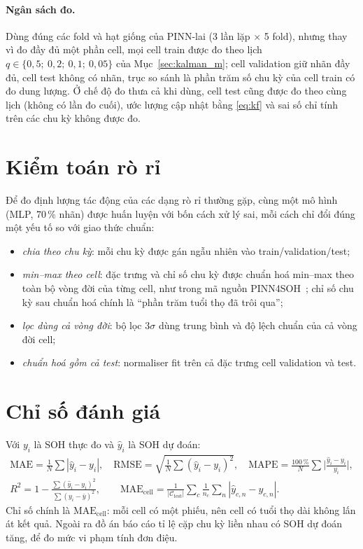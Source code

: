 \documentclass[12pt,a4paper,oneside]{report}
\theoremstyle{plain}
\theoremstyle{definition}
\begin{document}
\paragraph{Ngân sách đo.} Dùng đúng các fold và hạt giống của PINN-lai (3 lần lặp $\times$ 5 fold), nhưng thay vì đo
đầy đủ một phần cell, mọi cell train được đo theo lịch $q \in \{0{,}5;\ 0{,}2;\ 0{,}1;\ 0{,}05\}$ của
Mục~\ref{sec:kalman_m}; cell validation giữ nhãn đầy đủ, cell test không có nhãn, trục so sánh là phần trăm số chu kỳ
của cell train có đo dung lượng. Ở chế độ đo thưa cả khi dùng, cell test cũng được đo theo cùng lịch (không có lần đo
cuối), ước lượng cập nhật bằng \eqref{eq:kf} và sai số chỉ tính trên các chu kỳ không được đo.
\section{Kiểm toán rò rỉ}\label{sec:audit}

Để đo định lượng tác động của các dạng rò rỉ thường gặp, cùng một mô hình (MLP, 70\,\% nhãn) được huấn luyện với
bốn cách xử lý sai, mỗi cách chỉ đổi đúng một yếu tố so với giao thức chuẩn:
\begin{itemize}
\item \emph{chia theo chu kỳ}: mỗi chu kỳ được gán ngẫu nhiên vào train/validation/test;
\item \emph{min--max theo cell}: đặc trưng và chỉ số chu kỳ được chuẩn hoá min--max theo toàn bộ vòng đời của
      từng cell, như trong mã nguồn PINN4SOH~\cite{wang2024}; chỉ số chu kỳ sau chuẩn hoá chính là “phần trăm tuổi
      thọ đã trôi qua”;
\item \emph{lọc dùng cả vòng đời}: bộ lọc $3\sigma$ dùng trung bình và độ lệch chuẩn của cả vòng đời cell;
\item \emph{chuẩn hoá gồm cả test}: normaliser fit trên cả đặc trưng cell validation và test.
\end{itemize}

\section{Chỉ số đánh giá}

Với $y_i$ là SOH thực đo và $\hat y_i$ là SOH dự đoán:
\begin{gather}
\mathrm{MAE} = \tfrac{1}{N}\textstyle\sum|\hat y_i - y_i|, \quad
\mathrm{RMSE} = \sqrt{\tfrac{1}{N}\textstyle\sum(\hat y_i - y_i)^2}, \quad
\mathrm{MAPE} = \tfrac{100\,\%}{N}\textstyle\sum\big|\tfrac{\hat y_i - y_i}{y_i}\big|, \\
R^2 = 1 - \frac{\sum(\hat y_i - y_i)^2}{\sum(y_i - \bar y)^2}, \qquad
\mathrm{MAE}_\text{cell} = \frac{1}{|\mathcal{C}_\text{test}|}\sum_{c}\frac{1}{n_c}\sum_{n}|\hat y_{c,n} - y_{c,n}|.
\end{gather}
Chỉ số chính là $\mathrm{MAE}_\text{cell}$: mỗi cell có một phiếu, nên cell có tuổi thọ dài không lấn át kết
quả. Ngoài ra đồ án báo cáo tỉ lệ cặp chu kỳ liền nhau có SOH dự đoán tăng, để đo mức vi phạm tính đơn điệu.
\end{document}
